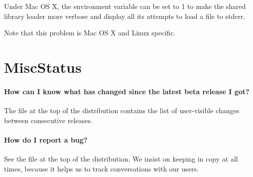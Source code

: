 Under Mac OS X, the  environment variable can
be set to 1 to make the shared library loader more verbose and display
all its attempts to load a file to stderr.

Note that this problem is Mac OS X and Linux specific.

\section{MiscStatus}

\paragraph{How can I know what has changed since the latest beta release I got?}

The file  at the top of the distribution
contains the list of user-visible changes between consecutive
releases.

\paragraph{How do I report a bug?}

See the file  at the top of the
distribution. We insist on keeping  in
copy at all times, because it helps us to track conversations with our
users.


